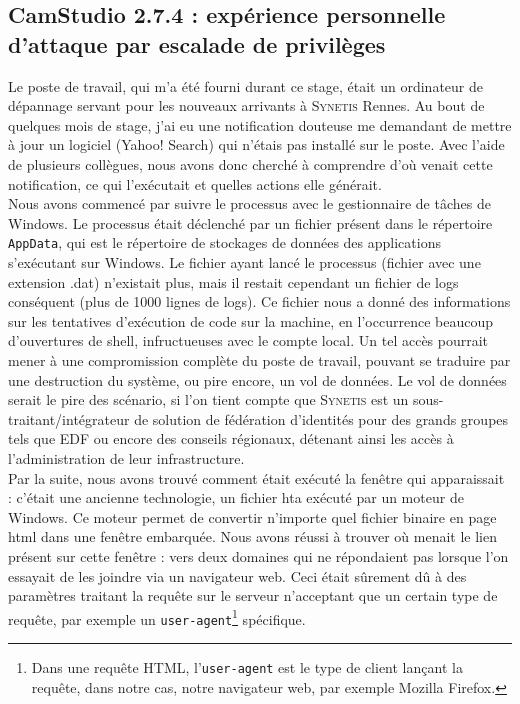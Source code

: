 \subsection{CamStudio 2.7.4 : expérience personnelle d'attaque par escalade de privilèges}
\label{subsec:camstudio}

Le poste de travail, qui m'a été fourni durant ce stage, était un ordinateur de dépannage servant pour les nouveaux arrivants à \textsc{Synetis} Rennes. Au bout de quelques mois de stage, j'ai eu une notification douteuse me demandant de mettre à jour un logiciel (Yahoo! Search) qui n'étais pas installé sur le poste. Avec l'aide de plusieurs collègues, nous avons donc cherché à comprendre d'où venait cette notification, ce qui l'exécutait et quelles actions elle générait.\\
Nous avons commencé par suivre le processus avec le gestionnaire de tâches de Windows. Le processus était déclenché par un fichier présent dans le répertoire \texttt{AppData}, qui est le répertoire de stockages de données des applications s'exécutant sur Windows. Le fichier ayant lancé le processus (fichier avec une extension .dat) n'existait plus, mais il restait cependant un fichier de logs conséquent (plus de 1000 lignes de logs). Ce fichier nous a donné des informations sur les tentatives d'exécution de code sur la machine, en l'occurrence beaucoup d'ouvertures de shell, infructueuses avec le compte local. Un tel accès pourrait mener à une compromission complète du poste de travail, pouvant se traduire par une destruction du système, ou pire encore, un vol de données. Le vol de données serait le pire des scénario, si l'on tient compte que \textsc{Synetis} est un sous-traitant/intégrateur de solution de fédération d'identités pour des grands groupes tels que EDF ou encore des conseils régionaux, détenant ainsi les accès à l'administration de leur infrastructure.\\
Par la suite, nous avons trouvé comment était exécuté la fenêtre qui apparaissait : c'était une ancienne technologie, un fichier hta exécuté par un moteur de Windows. Ce moteur permet de convertir n'importe quel fichier binaire en page html dans une fenêtre embarquée. Nous avons réussi à trouver où menait le lien présent sur cette fenêtre : vers deux domaines qui ne répondaient pas lorsque l'on essayait de les joindre via un navigateur web. Ceci était sûrement dû à des paramètres traitant la requête sur le serveur n'acceptant que un certain type de requête, par exemple un \texttt{user-agent}\footnote{Dans une requête HTML, l'\texttt{user-agent} est le type de client lançant la requête, dans notre cas, notre navigateur web, par exemple Mozilla Firefox.} spécifique.\\
